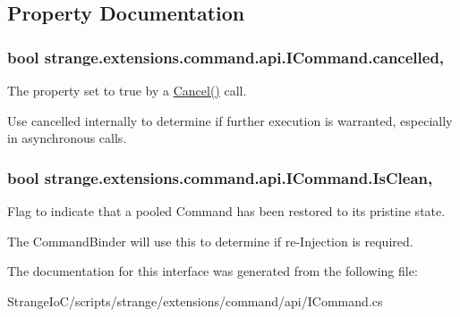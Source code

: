\subsection{Property Documentation}
\hypertarget{interfacestrange_1_1extensions_1_1command_1_1api_1_1_i_command_a213e1477e49f74dbbaa9a85887af4b5b}{
\subsubsection[{cancelled}]{\setlength{\rightskip}{0pt plus 5cm}bool strange.\-extensions.\-command.\-api.\-I\-Command.\-cancelled\hspace{0.3cm}{\ttfamily [get]}, {\ttfamily [set]}}}\label{interfacestrange_1_1extensions_1_1command_1_1api_1_1_i_command_a213e1477e49f74dbbaa9a85887af4b5b}


The property set to true by a \hyperlink{interfacestrange_1_1extensions_1_1command_1_1api_1_1_i_command_afe6c708912de7fe65dbe44d1ba83b547}{Cancel()} call. 

Use cancelled internally to determine if further execution is warranted, especially in asynchronous calls. \hypertarget{interfacestrange_1_1extensions_1_1command_1_1api_1_1_i_command_a66e999177d73a0681d307d0b250cb338}{
\subsubsection[{Is\-Clean}]{\setlength{\rightskip}{0pt plus 5cm}bool strange.\-extensions.\-command.\-api.\-I\-Command.\-Is\-Clean\hspace{0.3cm}{\ttfamily [get]}, {\ttfamily [set]}}}\label{interfacestrange_1_1extensions_1_1command_1_1api_1_1_i_command_a66e999177d73a0681d307d0b250cb338}


Flag to indicate that a pooled Command has been restored to its pristine state. 

The Command\-Binder will use this to determine if re-\/\-Injection is required. 

The documentation for this interface was generated from the following file\-:\begin{DoxyCompactItemize}
\item 
Strange\-Io\-C/scripts/strange/extensions/command/api/I\-Command.\-cs\end{DoxyCompactItemize}
